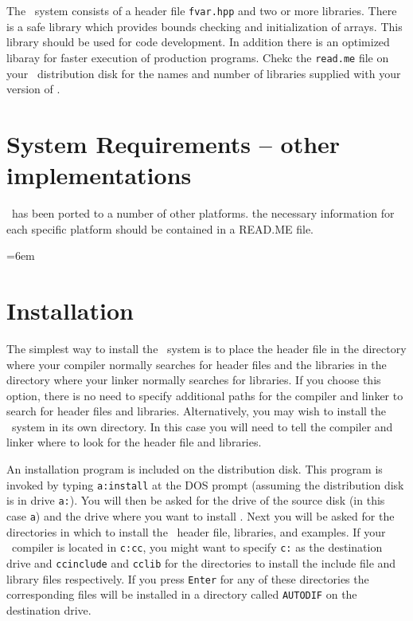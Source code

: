 \documentclass[12pt]{book}
\begin{document}
The \AD\ system consists of a header file {\tt fvar.hpp} and
two or more libraries. There is a safe library which provides bounds checking
and initialization of arrays. This library should be used for code
development. In addition there is an optimized libaray for faster execution
of production programs. Chekc the {\tt read.me} file on your \AD\
distribution disk for the names and number of libraries supplied with
your version of \AD.

\section{System Requirements -- other implementations}
\AD\ has been ported to a number of other platforms.
the necessary information for each specific platform should be
contained in a READ.ME file. 


\par{\parskip=0pt\parindent=6em
\par}

\section{Installation}

The simplest way to install the \AD\ system is to place the
header file in the directory where your compiler normally searches for
header files and the libraries in
the directory where your linker normally searches for
libraries.
If you choose this option, there is no need to specify additional
paths for the compiler and linker to search for header files and libraries.
Alternatively, you may wish to install the \AD\ system in its own
directory. In this case you will need to tell the compiler and linker
where to look for the header file and libraries.

An installation program is included on the distribution disk.
This program is invoked by typing {\tt a:install} at the DOS prompt
(assuming the distribution disk is in drive {\tt a:}).
You will then be asked for the drive of the source disk (in this case
{\tt a}) and the drive where you want to install \AD.
Next you will be asked for the directories in which to
install the \AD\ header file, libraries, and examples. 
If your \cplus\ compiler is located in {\tt c:\bs cc}, you might
want to specify {\tt c:} as the destination drive and
{\tt \bs cc\bs include} and {\tt \bs cc\bs lib} for the 
directories to 
install the include file and library files respectively.
If you press {\tt Enter} for
any of these directories the corresponding files will be installed in
a directory called {\tt \bs AUTODIF} on the destination drive.
\end{document}

